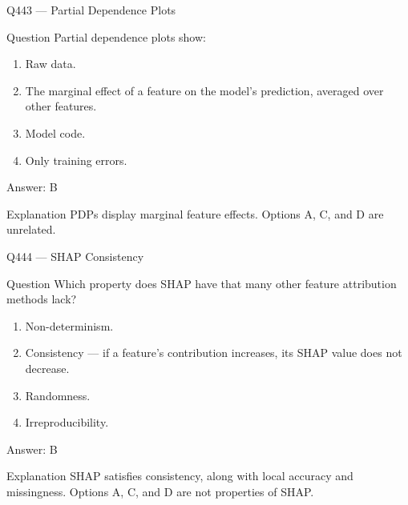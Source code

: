\documentclass[aspectratio=169,8pt]{beamer}
\begin{document}
	\begin{frame}{Q443 --- Partial Dependence Plots}
		\begin{block}{Question}
			Partial dependence plots show:
			\begin{enumerate}
				\item Raw data.
				\item The marginal effect of a feature on the model's prediction, averaged over other features.
				\item Model code.
				\item Only training errors.
			\end{enumerate}
		\end{block}
		\begin{exampleblock}{Answer: B}\end{exampleblock}
		\begin{block}{Explanation}
			PDPs display marginal feature effects. Options A, C, and D are unrelated.
		\end{block}
	\end{frame}
	
	\begin{frame}{Q444 --- SHAP Consistency}
		\begin{block}{Question}
			Which property does SHAP have that many other feature attribution methods lack?
			\begin{enumerate}
				\item Non-determinism.
				\item Consistency --- if a feature's contribution increases, its SHAP value does not decrease.
				\item Randomness.
				\item Irreproducibility.
			\end{enumerate}
		\end{block}
		\begin{exampleblock}{Answer: B}\end{exampleblock}
		\begin{block}{Explanation}
			SHAP satisfies consistency, along with local accuracy and missingness. Options A, C, and D are not properties of SHAP.
		\end{block}
	\end{frame}
	
\end{document}
